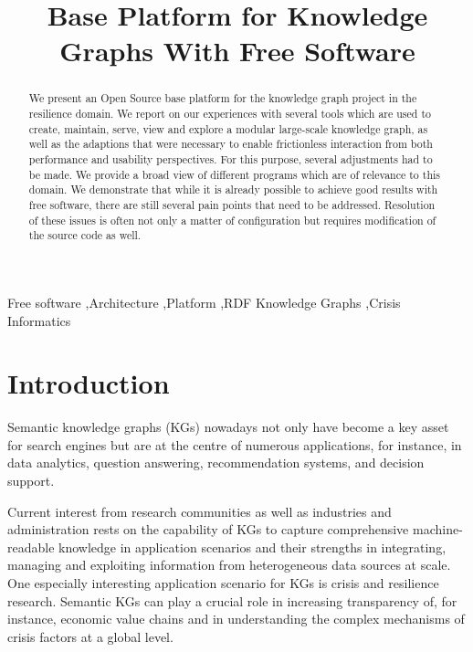 \documentclass[
hf
]{ceurart}
\begin{document}
\title{Base Platform for Knowledge Graphs With Free Software}



\begin{abstract}
We present an Open Source base platform for the \CoyPu knowledge graph project in the resilience domain. We report on our experiences with several tools which are used to create, maintain, serve, view and explore a modular large-scale knowledge graph, as well as 
the adaptions that were necessary to enable frictionless interaction from both performance and usability perspectives.
For this purpose, several adjustments had to be made. We provide a broad view of different programs which are of relevance to this domain. We demonstrate that while it is already possible to achieve good results with free software, there are still several pain points that need to be addressed. Resolution of these issues is often not only a matter of configuration but requires modification of the source code as well.
\end{abstract}

\begin{keywords}
Free software \sep Architecture \sep Platform \sep RDF Knowledge Graphs \sep Crisis Informatics
\end{keywords}

\maketitle

\setlength{\aweboxleftmargin}{0.06\linewidth}\setlength{\aweboxcontentwidth}{0.9\linewidth}

\section{Introduction} %

Semantic knowledge graphs (KGs) nowadays not only have become a key asset for search engines but are at the centre of numerous applications, for instance, in data analytics, question answering, recommendation systems, and decision support. 

Current interest from research communities as well as industries and administration rests on the capability of KGs to capture comprehensive machine-readable knowledge in application scenarios and their strengths in integrating, managing and exploiting information from heterogeneous data sources at scale. One especially interesting application scenario for KGs is crisis and resilience research. Semantic KGs can play a crucial role in increasing transparency of, for instance, economic value chains and in understanding the complex mechanisms of crisis factors at a global level. 
\end{document}
